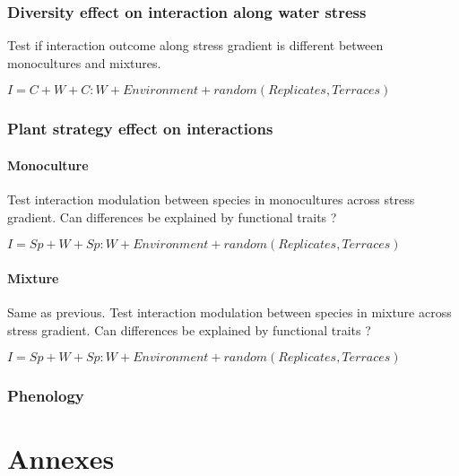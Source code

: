 \documentclass[12pt]{article} %
\begin{document}
\subsubsection{Diversity effect on interaction along water stress}
Test if interaction outcome along stress gradient is different between monocultures and mixtures.

$I= C + W + C:W + Environment + random(Replicates,Terraces)$

\subsubsection{Plant strategy effect on interactions}

\paragraph{Monoculture}
Test interaction modulation between species in monocultures across stress gradient. Can differences be explained by functional traits ?

$I= Sp + W + Sp:W + Environment + random(Replicates,Terraces)$

\paragraph{Mixture}
Same as previous. Test interaction modulation between species in mixture across stress gradient. Can differences be explained by functional traits ?

$I= Sp + W + Sp:W + Environment + random(Replicates,Terraces)$

\subsubsection{Phenology}




\begin{spacing}{1.0}

%
\end{spacing}

\section{Annexes}
\end{document}
